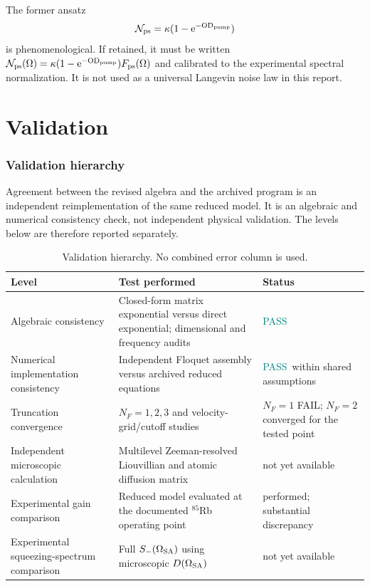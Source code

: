 \documentclass[11pt,a4paper]{article}
\newcommand{\e}{\mathrm e}
\newcommand{\pending}{\textcolor{amber}{not yet available}}
\newcommand{\pass}{\textcolor{teal}{PASS}}
\newcommand{\fail}{\textcolor{red!70!black}{FAIL}}
\begin{document}
The former ansatz
\[
\mathcal N_{\rm ps}=\kappa(1-\e^{-{\rm OD}_{\rm pump}})
\]
is phenomenological. If retained, it must be written
$\mathcal N_{\rm ps}(\Omega)=
\kappa(1-\e^{-{\rm OD}_{\rm pump}})F_{\rm ps}(\Omega)$ and calibrated to the
experimental spectral normalization. It is not used as a universal Langevin
noise law in this report.

\part{Validation}

\clearpage
\section{Validation hierarchy}

Agreement between the revised algebra and the archived program is an
independent reimplementation of the same reduced model. It is an algebraic
and numerical consistency check, not independent physical validation. The
levels below are therefore reported separately.

\begin{table}[ht]
\centering
\caption{Validation hierarchy. No combined error column is used.}
\label{tab:validation-hierarchy}
\small
\begin{tabularx}{\textwidth}{L{3.4cm}Y L{3.0cm}}
\toprule
Level & Test performed & Status\\
\midrule
Algebraic consistency & Closed-form matrix exponential versus direct
exponential; dimensional and frequency audits & \pass\\
Numerical implementation consistency & Independent Floquet assembly versus
archived reduced equations & \pass\ within shared assumptions\\
Truncation convergence & $N_F=1,2,3$ and velocity-grid/cutoff studies &
$N_F=1$ \fail; $N_F=2$ converged for the tested point\\
Independent microscopic calculation & Multilevel Zeeman-resolved
Liouvillian and atomic diffusion matrix & \pending\\
Experimental gain comparison & Reduced model evaluated at the documented
$^{85}$Rb operating point & performed; substantial discrepancy\\
Experimental squeezing-spectrum comparison & Full
$S_-(\Omega_{\rm SA})$ using microscopic $D(\Omega_{\rm SA})$ &
\pending\\
\bottomrule
\end{tabularx}
\end{table}
\end{document}

